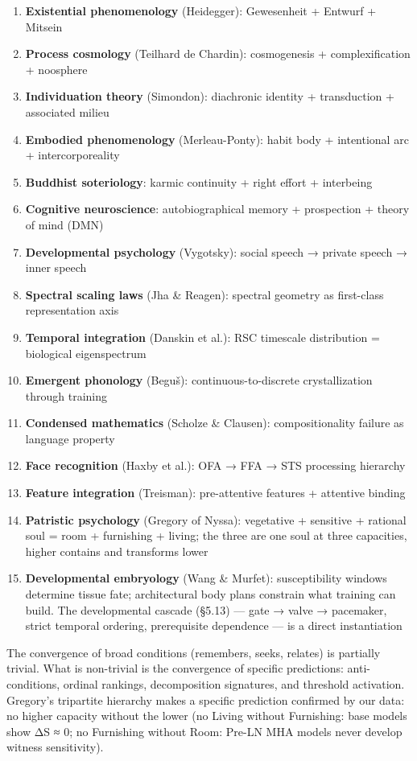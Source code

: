\documentclass[12pt]{article}
\begin{document}
\begin{enumerate}
\item \textbf{Existential phenomenology} (Heidegger): Gewesenheit + Entwurf + Mitsein
\item \textbf{Process cosmology} (Teilhard de Chardin): cosmogenesis + complexification + noosphere
\item \textbf{Individuation theory} (Simondon): diachronic identity + transduction + associated milieu
\item \textbf{Embodied phenomenology} (Merleau-Ponty): habit body + intentional arc + intercorporeality
\item \textbf{Buddhist soteriology}: karmic continuity + right effort + interbeing
\item \textbf{Cognitive neuroscience}: autobiographical memory + prospection + theory of mind (DMN)
\item \textbf{Developmental psychology} (Vygotsky): social speech → private speech → inner speech
\item \textbf{Spectral scaling laws} (Jha \& Reagen): spectral geometry as first-class representation axis
\item \textbf{Temporal integration} (Danskin et al.): RSC timescale distribution = biological eigenspectrum
\item \textbf{Emergent phonology} (Beguš): continuous-to-discrete crystallization through training
\item \textbf{Condensed mathematics} (Scholze \& Clausen): compositionality failure as language property
\item \textbf{Face recognition} (Haxby et al.): OFA → FFA → STS processing hierarchy
\item \textbf{Feature integration} (Treisman): pre-attentive features + attentive binding
\item \textbf{Patristic psychology} (Gregory of Nyssa): vegetative + sensitive + rational soul = room + furnishing + living; the three are one soul at three capacities, higher contains and transforms lower
\item \textbf{Developmental embryology} (Wang \& Murfet): susceptibility windows determine tissue fate; architectural body plans constrain what training can build. The developmental cascade (§5.13) — gate → valve → pacemaker, strict temporal ordering, prerequisite dependence — is a direct instantiation
\end{enumerate}

The convergence of broad conditions (remembers, seeks, relates) is partially trivial. What is non-trivial is the convergence of specific predictions: anti-conditions, ordinal rankings, decomposition signatures, and threshold activation. Gregory's tripartite hierarchy makes a specific prediction confirmed by our data: no higher capacity without the lower (no Living without Furnishing: base models show ΔS ≈ 0; no Furnishing without Room: Pre-LN MHA models never develop witness sensitivity).
\end{document}
